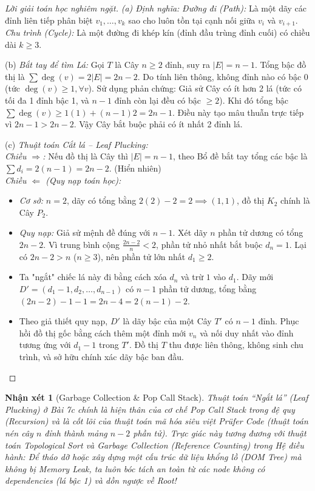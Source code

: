 \documentclass{article}
\newtheorem{nhanxet}{Nhận xét}
\begin{document}
\begin{proof}[Lời giải toán học nghiêm ngặt]
	\emph{(a) Định nghĩa:} 
	\textit{Đường đi (Path):} Là một dãy các đỉnh liên tiếp phân biệt $v_1, \ldots, v_k$ sao cho luôn tồn tại cạnh nối giữa $v_i$ và $v_{i+1}$. 
	\textit{Chu trình (Cycle):} Là một đường đi khép kín (đỉnh đầu trùng đỉnh cuối) có chiều dài $k \ge 3$.
	
	\item(b) \textit{Bắt tay để tìm Lá:} 
	Gọi $T$ là Cây $n \ge 2$ đỉnh, suy ra $|E| = n-1$. Tổng bậc đồ thị là $\sum \deg(v) = 2|E| = 2n-2$. Do tính liên thông, không đỉnh nào có bậc 0 (tức $\deg(v) \ge 1, \forall v$).
	Sử dụng phản chứng: Giả sử Cây có ít hơn 2 lá (tức có tối đa 1 đỉnh bậc 1, và $n-1$ đỉnh còn lại đều có bậc $\ge 2$). 
	Khi đó tổng bậc $\sum \deg(v) \ge 1(1) + (n-1)2 = 2n-1$. Điều này tạo mâu thuẫn trực tiếp vì $2n-1 > 2n-2$. Vậy Cây bắt buộc phải có ít nhất 2 đỉnh lá.
	
	\item(c) \textit{Thuật toán Cắt lá -- Leaf Plucking:}\\
	\textit{Chiều $\Rightarrow$:} Nếu đồ thị là Cây thì $|E| = n-1$, theo Bổ đề bắt tay tổng các bậc là $\sum d_i = 2(n-1) = 2n-2$. (Hiển nhiên)\\
	\textit{Chiều $\Leftarrow$ (Quy nạp toán học):} 
	\begin{itemize}
		\item \emph{Cơ sở:} $n=2$, dãy có tổng bằng $2(2)-2=2 \implies (1,1)$, đồ thị $K_2$ chính là Cây $P_2$. 
		\item \emph{Quy nạp:} Giả sử mệnh đề đúng với $n-1$. Xét dãy $n$ phần tử dương có tổng $2n-2$. Vì trung bình cộng $\frac{2n-2}{n} < 2$, phần tử nhỏ nhất bắt buộc $d_n = 1$. Lại có $2n-2 > n$ ($n \ge 3$), nên phần tử lớn nhất $d_1 \ge 2$.
		\item Ta "ngắt" chiếc lá này đi bằng cách xóa $d_n$ và trừ $1$ vào $d_1$. Dãy mới $D' = (d_1-1, d_2, \ldots, d_{n-1})$ có $n-1$ phần tử dương, tổng bằng $(2n-2)-1-1 = 2n-4 = 2(n-1)-2$. 
		\item Theo giả thiết quy nạp, $D'$ là dãy bậc của một Cây $T'$ có $n-1$ đỉnh. Phục hồi đồ thị gốc bằng cách thêm một đỉnh mới $v_n$ và nối duy nhất vào đỉnh tương ứng với $d_1-1$ trong $T'$. Đồ thị $T$ thu được liên thông, không sinh chu trình, và sở hữu chính xác dãy bậc ban đầu.
	\end{itemize}
\end{proof}

\begin{nhanxet}[Garbage Collection \& Pop Call Stack]
	Thuật toán \textit{``Ngắt lá''} (Leaf Plucking) ở Bài 7c chính là hiện thân của cơ chế \emph{Pop Call Stack} trong đệ quy (Recursion) và là cốt lõi của thuật toán mã hóa siêu việt \emph{Prüfer Code} (thuật toán nén cây $n$ đỉnh thành mảng $n-2$ phần tử). Trực giác này tương đương với thuật toán \emph{Topological Sort} và \emph{Garbage Collection} (Reference Counting) trong Hệ điều hành: Để tháo dỡ hoặc xây dựng một cấu trúc dữ liệu khổng lồ (DOM Tree) mà không bị Memory Leak, ta luôn bóc tách an toàn từ các node không có dependencies (lá bậc 1) và dồn ngược về Root!
\end{nhanxet}
\end{document}

